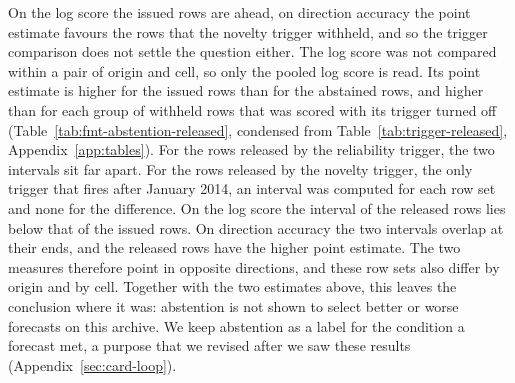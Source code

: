 On the log score the issued rows are ahead, on direction accuracy the point estimate favours the rows that the novelty trigger withheld, and so the trigger comparison does not settle the question either. The log score was not compared within a pair of origin and cell, so only the pooled log score is read. Its point estimate is higher for the issued rows than for the abstained rows, and higher than for each group of withheld rows that was scored with its trigger turned off (Table~\ref{tab:fmt-abstention-released}, condensed from Table~\ref{tab:trigger-released}, Appendix~\ref{app:tables}). For the rows released by the reliability trigger, the two intervals sit far apart. For the rows released by the novelty trigger, the only trigger that fires after January 2014, an interval was computed for each row set and none for the difference. On the log score the interval of the released rows lies below that of the issued rows. On direction accuracy the two intervals overlap at their ends, and the released rows have the higher point estimate. The two measures therefore point in opposite directions, and these row sets also differ by origin and by cell. Together with the two estimates above, this leaves the conclusion where it was: abstention is not shown to select better or worse forecasts on this archive. We keep abstention as a label for the condition a forecast met, a purpose that we revised after we saw these results (Appendix~\ref{sec:card-loop}).

\begin{table}[t]\centering\scriptsize
\caption{Rows that a trigger had withheld, scored with that trigger turned off, P2 on the headline archive, taken from Table~\ref{tab:trigger-released} (Appendix~\ref{app:tables}), beside the main run's issued rows (Table~\ref{tab:trigger-ablation}). Support and instability release no rows. The columns give released rows, pooled log score per row and direction accuracy.}
\label{tab:fmt-abstention-released}
\resizebox{\columnwidth}{!}{}
\end{table}


